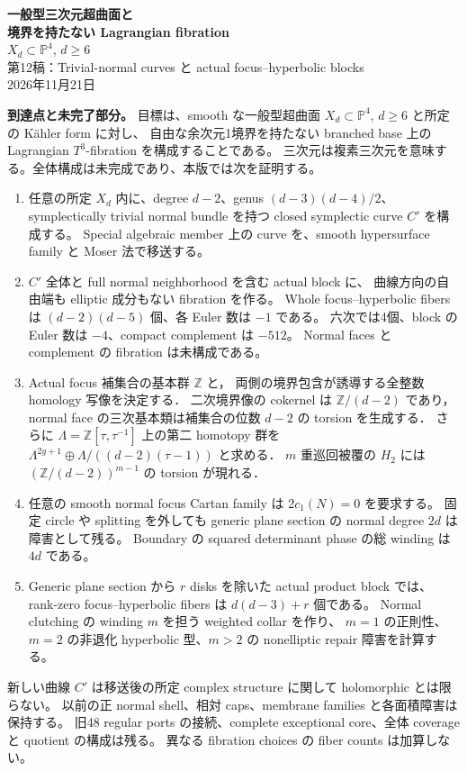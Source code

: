 \documentclass[11pt,a4paper]{article}
\theoremstyle{definition}
\newcommand{\PP}{\mathbb P}
\begin{document}
\begin{center}
{\LARGE\sffamily\bfseries\color{ink}一般型三次元超曲面と\\[0.3em]
境界を持たない Lagrangian fibration}\\[0.8em]
{\large $X_d\subset\PP^4$, $d\ge6$}\\[0.45em]
{\small 第12稿：Trivial-normal curves と actual focus--hyperbolic blocks}\\[0.6em]
2026年11月21日
\end{center}

\noindent\textbf{到達点と未完了部分。}
目標は、smooth な一般型超曲面 $X_d\subset\PP^4$, $d\ge6$ と所定の K\"ahler form に対し、
自由な余次元1境界を持たない branched base 上の Lagrangian $T^3$-fibration を構成することである。
三次元は複素三次元を意味する。全体構成は未完成であり、本版では次を証明する。
\begin{enumerate}[itemsep=0.25em,parsep=0pt]
\item 任意の所定 $X_d$ 内に、degree $d-2$、genus $(d-3)(d-4)/2$、
symplectically trivial normal bundle を持つ closed symplectic curve $C'$ を構成する。
Special algebraic member 上の curve を、smooth hypersurface family と Moser 法で移送する。
\item $C'$ 全体と full normal neighborhood を含む actual block に、
曲線方向の自由端も elliptic 成分もない fibration を作る。
Whole focus--hyperbolic fibers は $(d-2)(d-5)$ 個、各 Euler 数は $-1$ である。
六次では4個、block の Euler 数は $-4$、compact complement は $-512$。
Normal faces と complement の fibration は未構成である。
\item Actual focus 補集合の基本群 $\mathbb Z$ と，
両側の境界包含が誘導する全整数 homology 写像を決定する．
二次境界像の cokernel は $\mathbb Z/(d-2)$ であり，
normal face の三次基本類は補集合の位数 $d-2$ の torsion を生成する．
さらに $\Lambda=\mathbb Z[\tau,\tau^{-1}]$ 上の第二 homotopy 群を
$\Lambda^{2g+1}\oplus\Lambda/((d-2)(\tau-1))$ と求める．
$m$ 重巡回被覆の $H_2$ には $(\mathbb Z/(d-2))^{m-1}$ の torsion が現れる．
\item 任意の smooth normal focus Cartan family は $2c_1(N)=0$ を要求する。
固定 circle や splitting を外しても generic plane section の normal degree $2d$ は障害として残る。
Boundary の squared determinant phase の総 winding は $4d$ である。
\item Generic plane section から $r$ disks を除いた actual product block では、
rank-zero focus--hyperbolic fibers は $d(d-3)+r$ 個である。
Normal clutching の winding $m$ を担う weighted collar を作り、
$m=1$ の正則性、$m=2$ の非退化 hyperbolic 型、$m>2$ の nonelliptic repair 障害を計算する。
\end{enumerate}
新しい曲線 $C'$ は移送後の所定 complex structure に関して holomorphic とは限らない。
以前の正 normal shell、相対 caps、membrane families と各面積障害は保持する。
旧48 regular ports の接続、complete exceptional core、全体 coverage と quotient の構成は残る。
異なる fibration choices の fiber counts は加算しない。
\end{document}
